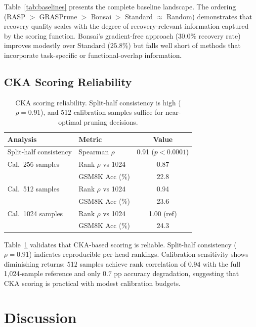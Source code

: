 \documentclass[11pt,a4paper]{article}
\begin{document}
Table~\ref{tab:baselines} presents the complete baseline landscape. The ordering (RASP $>$ GRASPrune $>$ Bonsai $>$ Standard $\approx$ Random) demonstrates that recovery quality scales with the degree of recovery-relevant information captured by the scoring function. Bonsai's gradient-free approach ($30.0$\% recovery rate) improves modestly over Standard ($25.8$\%) but falls well short of methods that incorporate task-specific or functional-overlap information.

\subsection{CKA Scoring Reliability}

\begin{table}[t]
\centering
\small
\begin{tabular}{@{}llc@{}}
\toprule
\textbf{Analysis} & \textbf{Metric} & \textbf{Value} \\
\midrule
Split-half consistency & Spearman $\rho$ & 0.91 ($p < 0.0001$) \\
\midrule
Cal.\ 256 samples & Rank $\rho$ vs 1024 & 0.87 \\
 & GSM8K Acc (\%) & 22.8 \\
Cal.\ 512 samples & Rank $\rho$ vs 1024 & 0.94 \\
 & GSM8K Acc (\%) & 23.6 \\
Cal.\ 1024 samples & Rank $\rho$ vs 1024 & 1.00 (ref) \\
 & GSM8K Acc (\%) & 24.3 \\
\bottomrule
\end{tabular}
\caption{CKA scoring reliability. Split-half consistency is high ($\rho = 0.91$), and 512 calibration samples suffice for near-optimal pruning decisions.}
\label{tab:reliability}
\end{table}

Table~\ref{tab:reliability} validates that CKA-based scoring is reliable. Split-half consistency ($\rho = 0.91$) indicates reproducible per-head rankings. Calibration sensitivity shows diminishing returns: 512 samples achieve rank correlation of $0.94$ with the full 1{,}024-sample reference and only $0.7$ pp accuracy degradation, suggesting that CKA scoring is practical with modest calibration budgets.

\section{Discussion}
\end{document}
